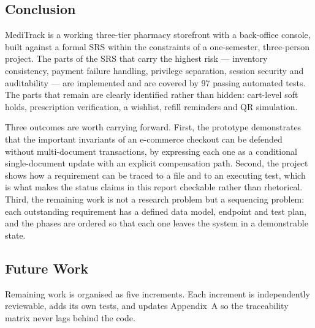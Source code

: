 \documentclass[11pt,a4paper]{article}
\begin{document}
\subsection{Conclusion}
MediTrack is a working three-tier pharmacy storefront with a back-office console, built
against a formal SRS within the constraints of a one-semester, three-person project. The
parts of the SRS that carry the highest risk --- inventory consistency, payment failure
handling, privilege separation, session security and auditability --- are implemented and
are covered by 97 passing automated tests. The parts that remain are clearly identified
rather than hidden: cart-level soft holds, prescription verification, a wishlist, refill
reminders and QR simulation.

Three outcomes are worth carrying forward. First, the prototype demonstrates that the
important invariants of an e-commerce checkout can be defended without multi-document
transactions, by expressing each one as a conditional single-document update with an
explicit compensation path. Second, the project shows how a requirement can be traced to
a file and to an executing test, which is what makes the status claims in this report
checkable rather than rhetorical. Third, the remaining work is not a research problem
but a sequencing problem: each outstanding requirement has a defined data model,
endpoint and test plan, and the phases are ordered so that each one leaves the system in
a demonstrable state.

\subsection{Future Work}
Remaining work is organised as five increments. Each increment is independently
reviewable, adds its own tests, and updates Appendix~A so the traceability matrix never
lags behind the code.
\end{document}
